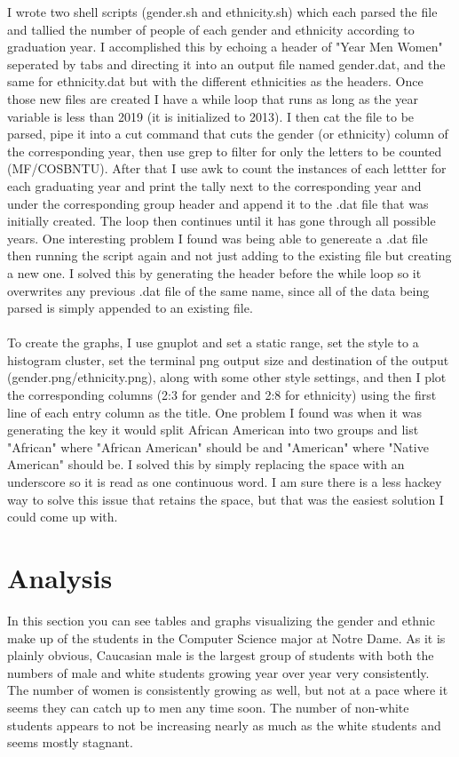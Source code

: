 \documentclass{article}
\begin{document}
I wrote two shell scripts (gender.sh and ethnicity.sh) which each parsed the 
file and tallied the number of people of each gender and ethnicity according to graduation year. I 
accomplished this by echoing a header of "Year Men Women" seperated by tabs and directing it into an 
output file named gender.dat, and the same for ethnicity.dat but with the different ethnicities as the 
headers. Once those new files are created I have a while loop that runs as long as the year variable is 
less than 2019 (it is initialized to 2013). I then cat the file to be parsed, pipe it into a cut command 
that cuts the gender (or ethnicity) column of the corresponding year, then use grep to filter for only 
the letters to be counted (MF/COSBNTU). After that I use awk to count the instances of each lettter for 
each graduating year and print the tally next to the corresponding year and under the corresponding group 
header and append it to the .dat file that was initially created. The loop then continues until it has 
gone through all possible years. One interesting problem I found was being able to genereate a .dat file 
then running the script again and not just adding to the existing file but creating a new one. I solved this 
by generating the header before the while loop so it overwrites any previous .dat file of the same name, since 
all of the data being parsed is simply appended to an existing file.\\ \\
To create the graphs, I use gnuplot and set a static range, set the style to a histogram cluster, set the 
terminal png output size and destination of the output (gender.png/ethnicity.png), along with some other 
style settings, and then I plot the corresponding columns (2:3 for gender and 2:8 for ethnicity) using the 
first line of each entry column as the title. One problem I found was when it was generating the key it would split 
African American into two groups and list "African" where "African American" should be and "American" where 
"Native American" should be. I solved this by simply replacing the space with an underscore so it is read as one continuous 
word. I am sure there is a less hackey way to solve this issue that retains the space, but that was the easiest 
solution I could come up with.

\section*{Analysis}

In this section you can see tables and graphs visualizing the gender and ethnic make up of the students in the Computer 
Science major at Notre Dame. As it is plainly obvious, Caucasian male is the largest group of students with both the 
numbers of male and white students growing year over year very consistently. The number of women is consistently 
growing as well, but not at a pace where it seems they can catch up to men any time soon. The number of non-white 
students appears to not be increasing nearly as much as the white students and seems mostly stagnant.
\end{document}
